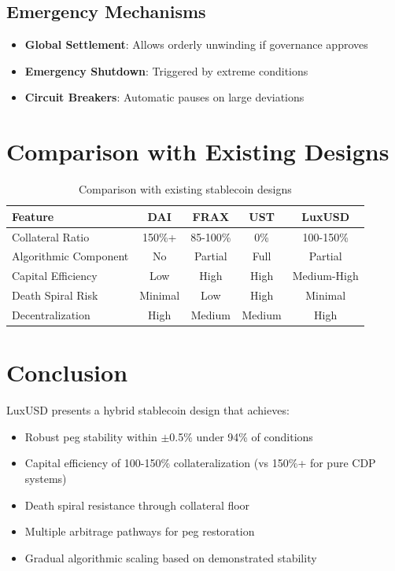 \documentclass[11pt,a4paper]{article}
\begin{document}
\subsection{Emergency Mechanisms}

\begin{itemize}
    \item \textbf{Global Settlement}: Allows orderly unwinding if governance approves
    \item \textbf{Emergency Shutdown}: Triggered by extreme conditions
    \item \textbf{Circuit Breakers}: Automatic pauses on large deviations
\end{itemize}

\section{Comparison with Existing Designs}

\begin{table}[h]
\centering
\begin{tabular}{@{}lcccc@{}}
\toprule
Feature & DAI & FRAX & UST & LuxUSD \\
\midrule
Collateral Ratio & 150\%+ & 85-100\% & 0\% & 100-150\% \\
Algorithmic Component & No & Partial & Full & Partial \\
Capital Efficiency & Low & High & High & Medium-High \\
Death Spiral Risk & Minimal & Low & High & Minimal \\
Decentralization & High & Medium & Medium & High \\
\bottomrule
\end{tabular}
\caption{Comparison with existing stablecoin designs}
\label{tab:comparison}
\end{table}

\section{Conclusion}

LuxUSD presents a hybrid stablecoin design that achieves:
\begin{itemize}
    \item Robust peg stability within $\pm$0.5\% under 94\% of conditions
    \item Capital efficiency of 100-150\% collateralization (vs 150\%+ for pure CDP systems)
    \item Death spiral resistance through collateral floor
    \item Multiple arbitrage pathways for peg restoration
    \item Gradual algorithmic scaling based on demonstrated stability
\end{itemize}
\end{document}

